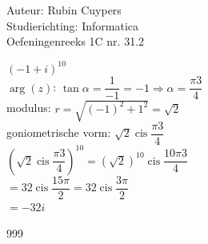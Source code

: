 \documentclass[a4paper]{article}
\begin{document}
  \newcommand{\cis}{\operatorname{cis}}


\noindent \large Auteur: Rubin Cuypers \\
\noindent \large Studierichting:  Informatica\\
\noindent \large Oefeningenreeks 1C  nr. 31.2\\

\medskip

\normalsize

$(-1+i)^{10}$\\

$\operatorname{arg}(z)$: $ \tan\alpha = \dfrac{1}{-1} =-1 \Rightarrow \alpha = \dfrac{\pi3}{4}$\\

modulus: $ r=\sqrt{(-1)^2+1^2}=\sqrt{2}$\\

goniometrische vorm: $\sqrt{2}\cis\dfrac{\pi3}{4}$\\

$\left(\sqrt{2}\cis\dfrac{\pi3}{4}\right)^{10} =( \sqrt{2})^{10}\cis\dfrac{10\pi3}{4}$\\

$=32\cis\dfrac{15\pi}{2} =32 \cis\dfrac{3\pi}{2}$\\

$=-32i$\\

\begin{thebibliography}{999}
\end{thebibliography}
\end{document}
